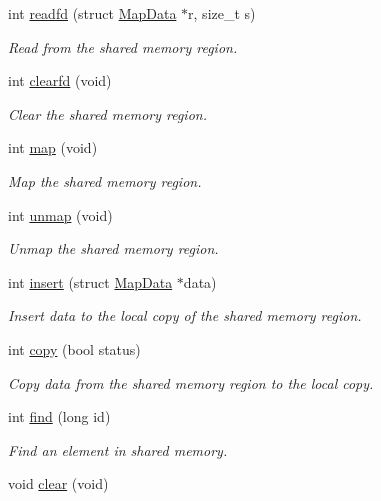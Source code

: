 \begin{DoxyCompactItemize}
int \hyperlink{namespaceAriaMap_a85b66efeb9b3e717ea5c8ee3f72bec1a}{readfd} (struct \hyperlink{structMapData}{Map\+Data} $\ast$r, size\+\_\+t s)
\begin{DoxyCompactList}\small\item\em Read from the shared memory region. \end{DoxyCompactList}\item 
int \hyperlink{namespaceAriaMap_a4f96bec0326c57c4fb11595fb5e48e52}{clearfd} (void)
\begin{DoxyCompactList}\small\item\em Clear the shared memory region. \end{DoxyCompactList}\item 
int \hyperlink{namespaceAriaMap_a16dcceca67f06165428001241996ab14}{map} (void)
\begin{DoxyCompactList}\small\item\em Map the shared memory region. \end{DoxyCompactList}\item 
int \hyperlink{namespaceAriaMap_a05e8b260d9c410e0dec752d41e22dd98}{unmap} (void)
\begin{DoxyCompactList}\small\item\em Unmap the shared memory region. \end{DoxyCompactList}\item 
int \hyperlink{namespaceAriaMap_abde04797d8f7dca3a40b492d7e7788a6}{insert} (struct \hyperlink{structMapData}{Map\+Data} $\ast$data)
\begin{DoxyCompactList}\small\item\em Insert data to the local copy of the shared memory region. \end{DoxyCompactList}\item 
int \hyperlink{namespaceAriaMap_af2742e0765093c4fc620caaaa76c38bc}{copy} (bool status)
\begin{DoxyCompactList}\small\item\em Copy data from the shared memory region to the local copy. \end{DoxyCompactList}\item 
int \hyperlink{namespaceAriaMap_ada0d85710793da4b08130a9b21a56090}{find} (long id)
\begin{DoxyCompactList}\small\item\em Find an element in shared memory. \end{DoxyCompactList}\item 
void \hyperlink{namespaceAriaMap_a1ae3654679044db830871fa3b0d409f1}{clear} (void)

\end{DoxyCompactItemize}
